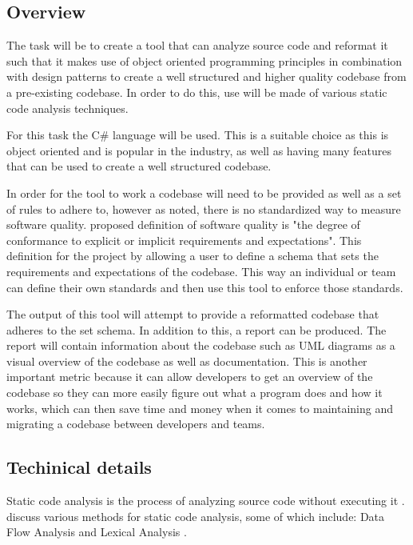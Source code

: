 
\subsection{Overview}
The task will be to create a tool that can analyze source code and reformat it such that it makes use of object oriented programming principles in combination with design patterns to create a well structured and higher quality codebase from a pre-existing codebase. In order to do this, use will be made of various static code analysis techniques.

For this task the C\# language will be used. This is a suitable choice as this is object oriented and is popular in the industry, as well as having many features that can be used to create a well structured codebase.

In order for the tool to work a codebase will need to be provided as well as a set of rules to adhere to, however as noted, there is no standardized way to measure software quality. \cite{8681007} proposed definition of software quality is "the degree of conformance to explicit or implicit requirements and expectations". This definition for the project by allowing a user to define a schema that sets the requirements and expectations of the codebase. This way an individual or team can define their own standards and then use this tool to enforce those standards.

The output of this tool will attempt to provide a reformatted codebase that adheres to the set schema. In addition to this, a report can be produced. The report will contain information about the codebase such as UML diagrams as a visual overview of the codebase as well as documentation. This is another important metric because it can allow developers to get an overview of the codebase so they can more easily figure out what a program does and how it works, which can then save time and money when it comes to maintaining and migrating a codebase between developers and teams.

\subsection{Techinical details}
Static code analysis is the process of analyzing source code without executing it \citep{8802820}. \cite{owasp/StaticCodeAnalysis} discuss various methods for static code analysis, some of which include: Data Flow Analysis \citep{owasp/StaticCodeAnalysis} and Lexical Analysis \citep{owasp/StaticCodeAnalysis}.

